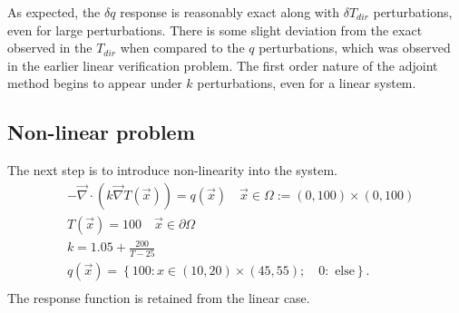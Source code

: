 \documentclass{article}
\newcommand{\vx}{\vec{x}}
\renewcommand{\div}{\vec{\nabla} \cdot}
\newcommand{\grad}{\vec{\nabla}}
\newcommand{\Tdir}{T_{dir}}
\begin{document}
As expected, the $\delta q$ response is reasonably exact along with $\delta \Tdir$ perturbations, even for large perturbations. There is some slight deviation from the exact observed in the $\Tdir$ when compared to the $q$ perturbations, which was observed in the earlier linear verification problem. The first order nature of the adjoint method begins to appear under $k$ perturbations, even for a linear system. 

\subsection{Non-linear problem}
The next step is to introduce non-linearity into the system.
\begin{equation}
\label{case1}
\begin{split}
& - \div ( k \grad T(\vx) ) = q(\vx) \quad \vx \in \Omega := (0,100) \times (0,100) \\
&T(\vx)=100 \quad \vx \in \partial \Omega \\
& k = 1.05 + \frac{200}{T - 25} \\
& q(\vx) = \left\lbrace 100: x \in (10,20) \times (45,55); \quad 0: \text{ else} \right\rbrace.\\
\end{split}
\end{equation}
The response function is retained from the linear case.
\end{document}

